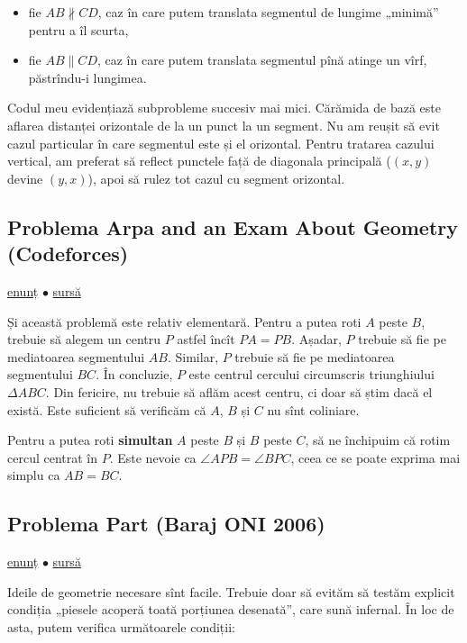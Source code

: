 \documentclass[../main.tex]{subfiles}
\begin{document}
\begin{itemize}
  \item fie $AB \nparallel CD$, caz în care putem translata segmentul de lungime „minimă” pentru a îl scurta,

  \item fie $AB \parallel CD$, caz în care putem translata segmentul pînă atinge un vîrf, păstrîndu-i lungimea.
\end{itemize}

Codul meu evidențiază subprobleme succesiv mai mici. Cărămida de bază este aflarea distanței orizontale de la un punct la un segment. Nu am reușit să evit cazul particular în care segmentul este și el orizontal. Pentru tratarea cazului vertical, am preferat să reflect punctele față de diagonala principală ($(x,y)$ devine $(y,x)$), apoi să rulez tot cazul cu segment orizontal.

\subsection{Problema Arpa and an Exam About Geometry (Codeforces)}
\label{problem:arpa-and-an-exam}

\href{https://codeforces.com/contest/851/problem/B}{enunț}
$\bullet$
\hyperref[code:arpa-and-an-exam]{sursă}

Și această problemă este relativ elementară. Pentru a putea roti $A$ peste $B$, trebuie să alegem un centru $P$ astfel încît $PA=PB$. Așadar, $P$ trebuie să fie pe mediatoarea segmentului $AB$. Similar, $P$ trebuie să fie pe mediatoarea segmentului $BC$. În concluzie, $P$ este centrul cercului circumscris triunghiului $\Delta ABC$. Din fericire, nu trebuie să aflăm acest centru, ci doar să știm dacă el există. Este suficient să verificăm că $A$, $B$ și $C$ nu sînt coliniare.

Pentru a putea roti \textbf{simultan} $A$ peste $B$ și $B$ peste $C$, să ne închipuim că rotim cercul centrat în $P$. Este nevoie ca $\angle APB = \angle BPC$, ceea ce se poate exprima mai simplu ca $AB=BC$.

\subsection{Problema Part (Baraj ONI 2006)}
\label{problem:part}

\href{https://kilonova.ro/problems/1861}{enunț}
$\bullet$
\hyperref[code:part]{sursă}

Ideile de geometrie necesare sînt facile. Trebuie doar să evităm să testăm explicit condiția „piesele acoperă toată porțiunea desenată”, care sună infernal. În loc de asta, putem verifica următoarele condiții:
\end{document}
